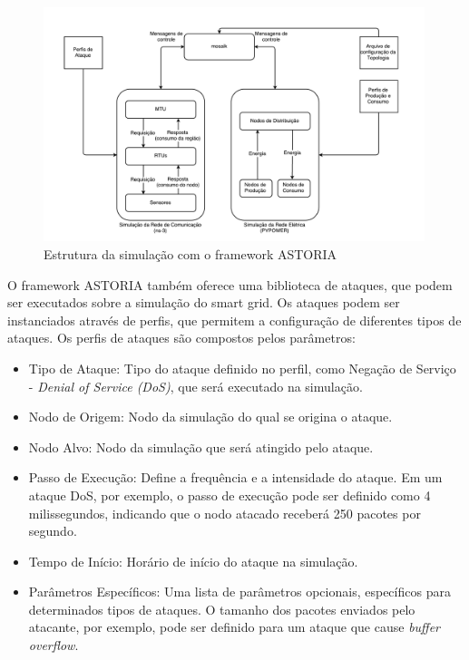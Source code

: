 \documentclass[cic,tc]{iiufrgs}
\begin{document}
\begin{figure}[h]
   \caption{Estrutura da simulação com o framework ASTORIA}
   \begin{center}
       \includegraphics[width=30em]{astoria_simulation}
   \end{center}
   \label{figsimulation}
\end{figure}

O framework ASTORIA também oferece uma biblioteca de ataques, que podem ser executados sobre a simulação do smart grid. Os ataques podem ser instanciados através de perfis, que permitem a configuração de diferentes tipos de ataques. Os perfis de ataques são compostos pelos parâmetros:
\begin{itemize}
\item{Tipo de Ataque}: Tipo do ataque definido no perfil, como Negação de Serviço - \emph{Denial of Service (DoS)}, que será executado na simulação.
\item{Nodo de Origem}: Nodo da simulação do qual se origina o ataque.
\item{Nodo Alvo}: Nodo da simulação que será atingido pelo ataque.
\item{Passo de Execução}: Define a frequência e a intensidade do ataque. Em um ataque DoS, por exemplo, o passo de execução pode ser definido como 4 milissegundos, indicando que o nodo atacado receberá 250 pacotes por segundo.
\item{Tempo de Início}: Horário de início do ataque na simulação.
\item{Parâmetros Específicos}: Uma lista de parâmetros opcionais, específicos para determinados tipos de ataques. O tamanho dos pacotes enviados pelo atacante, por exemplo, pode ser definido para um ataque que cause \emph{buffer overflow}.
\end{itemize}
\end{document}
